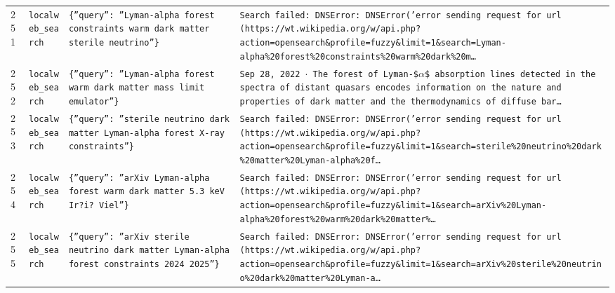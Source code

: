 \documentclass[11pt,a4paper]{article}
\begin{document}
\begin{longtable}{@{}p{}p{}p{}p{}@{}}
251 & \texttt{local}\newline\texttt{web\_\allowbreak{}search} & \texttt{\{''query'':\allowbreak{} ''Lyman-alpha forest constraints warm dark matter sterile neutrino''\}\allowbreak{}} & \texttt{Search failed:\allowbreak{} DNSError:\allowbreak{} DNSError('error sending request for url (https:\allowbreak{}/\allowbreak{}/\allowbreak{}wt.wikipedia.org/\allowbreak{}w/\allowbreak{}api.php?action=\allowbreak{}opensearch\&profile=\allowbreak{}fuzzy\&limit=\allowbreak{}1\&search=\allowbreak{}Lyman-alpha\%20forest\%20constraints\%20warm\%20dark\%20m\ldots{}\allowbreak{}} \\
252 & \texttt{local}\newline\texttt{web\_\allowbreak{}search} & \texttt{\{''query'':\allowbreak{} ''Lyman-alpha forest warm dark matter mass limit emulator''\}\allowbreak{}} & \texttt{Sep 28,\allowbreak{} 2022 $\cdot$ The forest of Lyman-\$$\alpha$\$ absorption lines detected in the spectra of distant quasars encodes information on the nature and properties of dark matter and the thermodynamics of diffuse bar\ldots{}\allowbreak{}} \\
253 & \texttt{local}\newline\texttt{web\_\allowbreak{}search} & \texttt{\{''query'':\allowbreak{} ''sterile neutrino dark matter Lyman-alpha forest X-ray constraints''\}\allowbreak{}} & \texttt{Search failed:\allowbreak{} DNSError:\allowbreak{} DNSError('error sending request for url (https:\allowbreak{}/\allowbreak{}/\allowbreak{}wt.wikipedia.org/\allowbreak{}w/\allowbreak{}api.php?action=\allowbreak{}opensearch\&profile=\allowbreak{}fuzzy\&limit=\allowbreak{}1\&search=\allowbreak{}sterile\%20neutrino\%20dark\%20matter\%20Lyman-alpha\%20f\ldots{}\allowbreak{}} \\
254 & \texttt{local}\newline\texttt{web\_\allowbreak{}search} & \texttt{\{''query'':\allowbreak{} ''arXiv Lyman-alpha forest warm dark matter 5.3 keV Ir?i? Viel''\}\allowbreak{}} & \texttt{Search failed:\allowbreak{} DNSError:\allowbreak{} DNSError('error sending request for url (https:\allowbreak{}/\allowbreak{}/\allowbreak{}wt.wikipedia.org/\allowbreak{}w/\allowbreak{}api.php?action=\allowbreak{}opensearch\&profile=\allowbreak{}fuzzy\&limit=\allowbreak{}1\&search=\allowbreak{}arXiv\%20Lyman-alpha\%20forest\%20warm\%20dark\%20matter\%\ldots{}\allowbreak{}} \\
255 & \texttt{local}\newline\texttt{web\_\allowbreak{}search} & \texttt{\{''query'':\allowbreak{} ''arXiv sterile neutrino dark matter Lyman-alpha forest constraints 2024 2025''\}\allowbreak{}} & \texttt{Search failed:\allowbreak{} DNSError:\allowbreak{} DNSError('error sending request for url (https:\allowbreak{}/\allowbreak{}/\allowbreak{}wt.wikipedia.org/\allowbreak{}w/\allowbreak{}api.php?action=\allowbreak{}opensearch\&profile=\allowbreak{}fuzzy\&limit=\allowbreak{}1\&search=\allowbreak{}arXiv\%20sterile\%20neutrino\%20dark\%20matter\%20Lyman-a\ldots{}\allowbreak{}} \\

\end{longtable}
\end{document}
